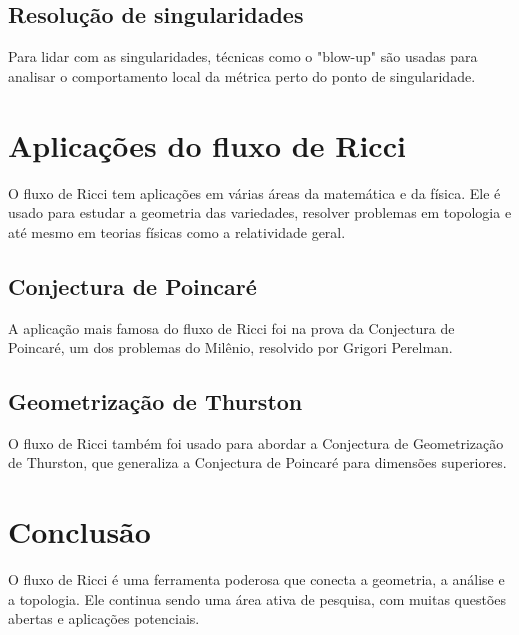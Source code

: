 \subsection{Resolução de singularidades}

Para lidar com as singularidades, técnicas como o "blow-up" são usadas para analisar o comportamento local da métrica perto do ponto de singularidade.

\section{Aplicações do fluxo de Ricci}

O fluxo de Ricci tem aplicações em várias áreas da matemática e da física. Ele é usado para estudar a geometria das variedades, resolver problemas em topologia e até mesmo em teorias físicas como a relatividade geral.

\subsection{Conjectura de Poincaré}

A aplicação mais famosa do fluxo de Ricci foi na prova da Conjectura de Poincaré, um dos problemas do Milênio, resolvido por Grigori Perelman.

\subsection{Geometrização de Thurston}

O fluxo de Ricci também foi usado para abordar a Conjectura de Geometrização de Thurston, que generaliza a Conjectura de Poincaré para dimensões superiores.

\section{Conclusão}

O fluxo de Ricci é uma ferramenta poderosa que conecta a geometria, a análise e a topologia. Ele continua sendo uma área ativa de pesquisa, com muitas questões abertas e aplicações potenciais.
